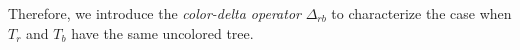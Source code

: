 \documentclass[final,3p,times]{elsarticle}
\newtheorem{definition}{Definition}[section]
\newtheorem{example}{Example}[section]
\newcommand{\mh}[1]{\begingroup\color{blue}#1\endgroup}
\begin{document}


Therefore, we introduce the \emph{color-delta operator} $\Delta_{rb}$ to characterize the case when $T_r$ and $T_b$ have the same uncolored tree.

%    	  
%    
%    	  
\end{document}
